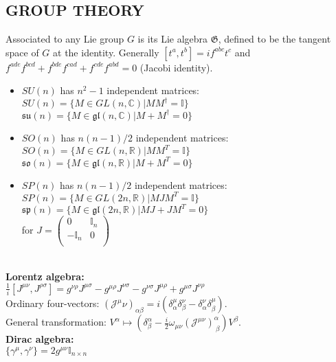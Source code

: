 \documentclass[a4paper, norsk, 8pt, landscape]{article}
\begin{document}
\begin{multicols*}{3}
\subsection*{\small  GROUP THEORY}
Associated to any Lie group $G$ is its Lie algebra $\mathfrak{G}$,
defined to be the tangent space of $G$ at the identity. Generally $[t^a,t^b]=if^{abc}t^{c}$ and \\
$f^{ade}f^{bcd}+f^{bde}f^{cad}+f^{cde}f^{abd}=0$ (Jacobi identity).
\begin{itemize}
  \item
    $SU(n)$ has $n^2-1$ independent matrices:\\
    $SU(n)=\{M\in GL(n,\mathbb{C})|MM^\dagger=\mathbb{I}\}$ \\
    $\mathfrak{su}(n)=\{M\in \mathfrak{gl}(n,\mathbb{C})|M+M^\dagger=0\}$
  \item
    $SO(n)$ has $n(n-1)/2$ independent matrices:\\
    $SO(n)=\{M\in GL(n,\mathbb{R})|MM^T=\mathbb{I}\}$ \\
    $\mathfrak{so}(n)=\{M\in \mathfrak{gl}(n,\mathbb{R})|M+M^T=0\}$
  \item
    $SP(n)$ has $n(n-1)/2$ independent matrices:\\
    $SP(n)=\{M\in GL(2n,\mathbb{R})|MJM^T=\mathbb{I}\}$ \\
    $\mathfrak{sp}(n)=\{M\in \mathfrak{gl}(2n,\mathbb{R})|MJ+JM^T=0\}$ \\
    for $J=\left(\begin{matrix}
    0 & \mathbb{I}_n \\
    -\mathbb{I}_n & 0 \\
    \end{matrix}\right)$
\end{itemize}
\\
 {\textbf{Lorentz algebra:}} \\
$\frac{1}{i}[J^{\mu\nu},J^{\rho \sigma}]=
g^{\nu\rho}J^{\mu\sigma}-g^{\mu\rho}J^{\nu\sigma}-g^{\nu\sigma}J^{\mu\rho}+g^{\mu\sigma}J^{\nu\rho}$ \\
Ordinary four-vectors:
$(\mathcal{J}^\mu\nu)_{\alpha \beta} = i(\delta^\mu_\alpha \delta^\nu_\beta-\delta^\nu_\alpha \delta^\mu_\beta)$. \\
General transformation:
$V^\alpha \mapsto \left(\delta^{\alpha}_\beta - \frac{i}{2}\omega_{\mu\nu}(\mathcal{J}^{\mu\nu})^\alpha_{\ \beta} \right)V^\beta$.
\\
 {\textbf{Dirac algebra:}} \\
$\{\gamma^\mu,\gamma^\nu\}=2g^{\mu\nu}\mathbb{I}_{n\times n}$ \\

\end{multicols*}
\end{document}
